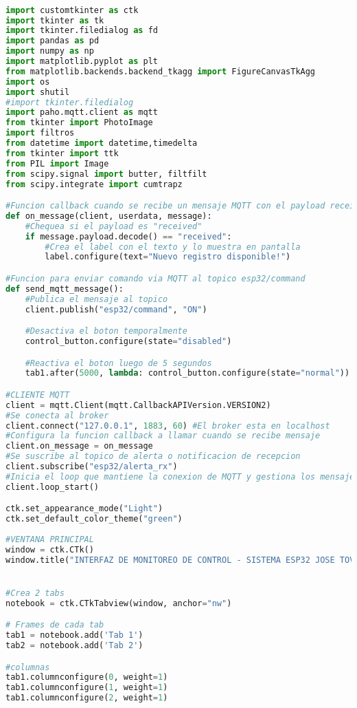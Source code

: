 
\begin{lstlisting}[language=Python, caption=Código para interfaz gráfica de control y monitoreo]

import customtkinter as ctk
import tkinter as tk
import tkinter.filedialog as fd
import pandas as pd
import numpy as np
import matplotlib.pyplot as plt
from matplotlib.backends.backend_tkagg import FigureCanvasTkAgg
import os
import shutil
#import tkinter.filedialog
import paho.mqtt.client as mqtt
from tkinter import PhotoImage
import filtros
from datetime import datetime,timedelta
from tkinter import ttk
from PIL import Image
from scipy.signal import butter, filtfilt
from scipy.integrate import cumtrapz

#Funcion callback cuando se recibe un mensaje MQTT con el payload received
def on_message(client, userdata, message):
    #Chequea si el payload es "received"
    if message.payload.decode() == "received":
        #Crea el label con el texto y lo muestra en pantalla
        label.configure(text="Nuevo registro disponible!")

#Funcion para enviar comando via MQTT al topico esp32/command 
def send_mqtt_message():
    #Publica el mensaje al topico
    client.publish("esp32/command", "ON")

    #Desactiva el boton temporalmente
    control_button.configure(state="disabled")

    #Reactiva el boton luego de 5 segundos
    tab1.after(5000, lambda: control_button.configure(state="normal"))

#CLIENTE MQTT
client = mqtt.Client(mqtt.CallbackAPIVersion.VERSION2)
#Se conecta al broker
client.connect("127.0.0.1", 1883, 60) #El broker esta en localhost
#Configura la funcion callback a llamar cuando se recibe mensaje
client.on_message = on_message
#Se suscribe al topico de alerta o notificacion de recepcion
client.subscribe("esp32/alerta_rx")
#Inicia el loop que mantiene la conexion de MQTT y gestiona los mensajes
client.loop_start()

ctk.set_appearance_mode("Light")   
ctk.set_default_color_theme("green")  
 
#VENTANA PRINCIPAL
window = ctk.CTk()
window.title("INTERFAZ DE MONITOREO DE CONTROL - SISTEMA ESP32 JOSE TOVAR")


#Crea 2 tabs
notebook = ctk.CTkTabview(window, anchor="nw")

# Frames de cada tab
tab1 = notebook.add('Tab 1')
tab2 = notebook.add('Tab 2')

#columnas
tab1.columnconfigure(0, weight=1)
tab1.columnconfigure(1, weight=1)
tab1.columnconfigure(2, weight=1)



\end{lstlisting}
